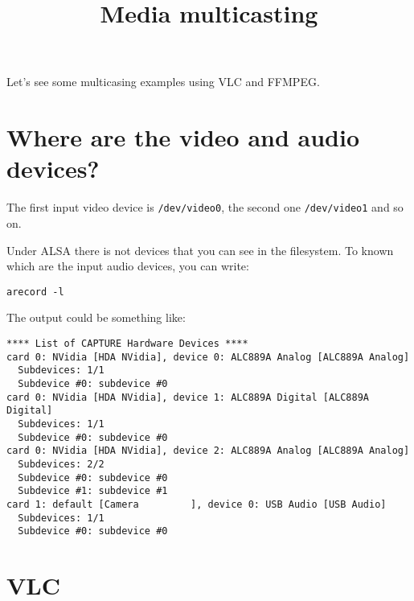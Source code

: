 \title{Media multicasting}

\maketitle
\tableofcontents

Let's see some multicasing examples using VLC and FFMPEG.

\section{Where are the video and audio devices?}
The first input video device is \texttt{/dev/video0}, the second one
\texttt{/dev/video1} and so on.

Under ALSA there is not devices that you can see in the filesystem. To
known which are the input audio devices, you can write:
\begin{verbatim}
arecord -l
\end{verbatim}
The output could be something like:
\begin{verbatim}
**** List of CAPTURE Hardware Devices ****
card 0: NVidia [HDA NVidia], device 0: ALC889A Analog [ALC889A Analog]
  Subdevices: 1/1
  Subdevice #0: subdevice #0
card 0: NVidia [HDA NVidia], device 1: ALC889A Digital [ALC889A Digital]
  Subdevices: 1/1
  Subdevice #0: subdevice #0
card 0: NVidia [HDA NVidia], device 2: ALC889A Analog [ALC889A Analog]
  Subdevices: 2/2
  Subdevice #0: subdevice #0
  Subdevice #1: subdevice #1
card 1: default [Camera         ], device 0: USB Audio [USB Audio]
  Subdevices: 1/1
  Subdevice #0: subdevice #0
\end{verbatim}

\section{VLC}

